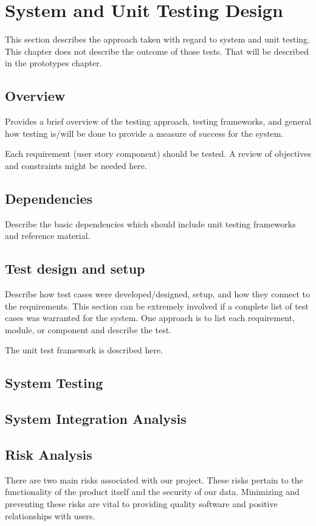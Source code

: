 

\chapter{System and Unit Testing Design}

This section describes the approach taken with regard to system and unit testing.    This chapter does not describe the outcome of those tests.  That will be described in the prototypes chapter.     

\section{Overview}
Provides a brief overview of the testing approach, testing frameworks, and general 
how testing is/will be done to provide a measure of success for the system. 

Each requirement (user story component) should be tested.    A review of objectives and
constraints might be needed here.  

\section{Dependencies}
Describe the basic dependencies which should include unit testing frameworks and 
reference material. 


\section{Test design and setup}
Describe how test cases were developed/designed, setup, and how they connect to the requirements.  This section can 
be extremely involved if a complete list of test cases was warranted for the system.   One 
approach is to list each requirement, module, or component and describe the test.

The unit test framework is described here.   

\section{System Testing}

\section{System Integration Analysis}

\section{Risk Analysis}
There are two main risks associated with our project. These risks pertain to the functionality of the product itself and the security of our data.
Minimizing and preventing these risks are vital to providing quality software and positive relationships with users.

